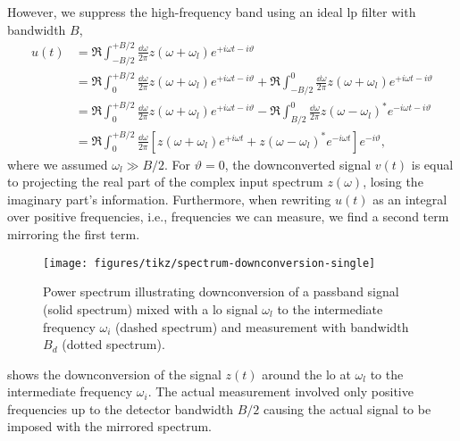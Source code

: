 However, we suppress the high-frequency band using an ideal \gls{lp} filter with bandwidth $B$,
\begin{equation}
	\begin{split}
		u(t)
		&=
		\Re
		\int_{-B/2}^{+B/2}\frac{\dd{\omega}}{2\pi}
		z(\omega+\omega_l)
		e^{+i\omega t-i\vartheta}
		\\
		&=
		\Re
		\int_{0}^{+B/2}\frac{\dd{\omega}}{2\pi}
		z(\omega+\omega_l)
		e^{+i\omega t-i\vartheta}
		+
		\Re
		\int_{-B/2}^{0}\frac{\dd{\omega}}{2\pi}
		z(\omega+\omega_l)
		e^{+i\omega t-i\vartheta}
		\\
		&=
		\Re
		\int_{0}^{+B/2}\frac{\dd{\omega}}{2\pi}
		z(\omega+\omega_l)
		e^{+i\omega t-i\vartheta}
		-
		\Re
		\int_{B/2}^{0}\frac{\dd{\omega}}{2\pi}
		z(\omega-\omega_l)^*
		e^{-i\omega t-i\vartheta}
		\\
		&=
		\Re
		\int_{0}^{+B/2}\frac{\dd{\omega}}{2\pi}
		\left[
			z(\omega+\omega_l)
			e^{+i\omega t}
			+
			z(\omega-\omega_l)^*
			e^{-i\omega t}
		\right]
		e^{-i\vartheta}
		,
	\end{split}
	\label{eq:downconversion_real}
\end{equation}
where we assumed $\omega_l\gg B/2$.
For $\vartheta=0$, the downconverted signal $v(t)$ is equal to projecting the real part of the complex input spectrum $z(\omega)$, losing the imaginary part's information.
Furthermore, when rewriting $u(t)$ as an integral over positive frequencies, i.e., frequencies we can measure, we find a second term mirroring the first term.
\begin{figure}[htb]
	\centering
	\texttt{[image: figures/tikz/spectrum-downconversion-single]}
	\caption{Power spectrum illustrating downconversion of a passband signal (solid spectrum) mixed with a \gls{lo} signal $\omega_l$ to the intermediate frequency $\omega_i$ (dashed spectrum) and measurement with bandwidth $B_d$ (dotted spectrum).}\label{fig:spectrum_downconversion_single}
\end{figure}
 shows the downconversion of the signal $z(t)$ around the \gls{lo} at $\omega_l$ to the intermediate frequency $\omega_i$.
The actual measurement involved only positive frequencies up to the detector bandwidth $B/2$ causing the actual signal to be imposed with the mirrored spectrum.

